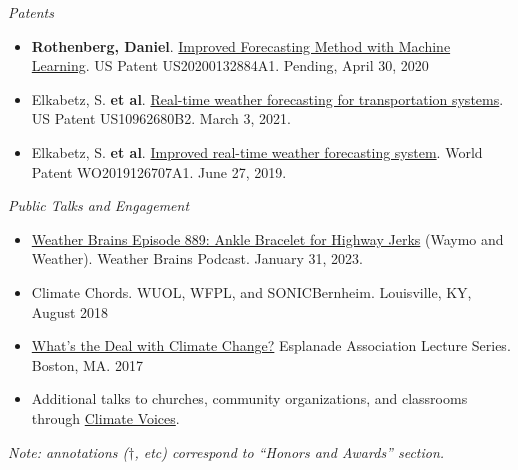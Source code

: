 \documentclass[11pt,letterpaper]{article}
\begin{document}
\bigskip
\emph{Patents}
\medskip
\begin{itemize}[itemindent=-10pt]

 \item \textbf{Rothenberg, Daniel}. \href{https://patents.google.com/patent/US20200132884A1/en}{Improved Forecasting Method with Machine Learning}. US Patent US20200132884A1. Pending, April 30, 2020

 \item Elkabetz, S. \textbf{et al}. \href{https://patents.google.com/patent/US10962680B2/en}{Real-time weather forecasting for transportation systems}. US Patent US10962680B2. March 3, 2021.

 \item Elkabetz, S. \textbf{et al}. \href{https://patents.google.com/patent/WO2019126707A1/}{Improved real-time weather forecasting system}. World Patent WO2019126707A1. June 27, 2019.
 
\end{itemize}


\bigskip
\emph{Public Talks and Engagement}
\medskip
\begin{itemize}[itemindent=-10pt]

 \item \href{https://weatherbrains.com/?p=10227}{Weather Brains Episode 889: Ankle Bracelet for Highway Jerks} (Waymo and Weather). Weather Brains Podcast. January 31, 2023.

 \item Climate Chords. WUOL, WFPL, and SONICBernheim. Louisville, KY, August 2018

 \item \href{https://docs.google.com/presentation/d/158WNGamjcRgUr1TvOVVixOQXRt1uc2kUyYe5a6D9ICA/edit?usp=drive_web}{What's the Deal with Climate Change?} Esplanade Association Lecture Series. Boston, MA. 2017

 \item Additional talks to churches, community organizations, and classrooms through \href{https://climatevoices.org/}{Climate Voices}.

\end{itemize}

\vspace{0.1cm}

\emph{\small{Note: annotations ($\dagger$, etc) correspond to ``Honors and Awards'' section.}}


\end{document}
